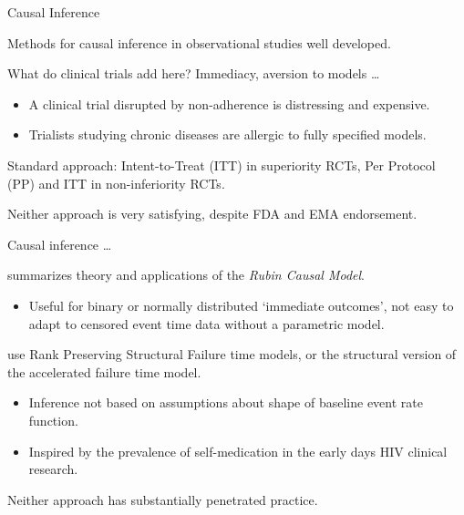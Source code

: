 \documentclass[11pt]{beamer}
\begin{document}
\begin{frame}{Causal Inference}
	
Methods for causal inference in observational studies well developed.

What do clinical trials add here?  Immediacy, aversion to models \ldots

\begin{itemize}
	\item A clinical trial disrupted by non-adherence is distressing and expensive.
	
	\item Trialists studying chronic diseases are allergic to fully specified models.
\end{itemize}
   
 
Standard approach: Intent-to-Treat (ITT) in superiority RCTs, Per Protocol (PP) and ITT in non-inferiority RCTs.

Neither approach is very satisfying, despite FDA and EMA endorsement. 

\end{frame}

\begin{frame}{Causal inference \ldots}
	
\cite{imbens2015causal} summarizes theory and applications of the \textsl{Rubin Causal Model}.

\begin{itemize}
	\item Useful for binary or normally distributed `immediate outcomes', not easy to adapt to censored event time data without a parametric model.
\end{itemize}

\cite{robins1991correcting} use Rank Preserving Structural Failure time models, or the structural version of the accelerated failure time model.

\begin{itemize}
	
	\item Inference not based on assumptions about shape of baseline event rate function.
	
	\item Inspired by the prevalence of self-medication in the early days HIV clinical research.
\end{itemize}

Neither approach has substantially penetrated practice.
	
\end{frame}
\end{document}
